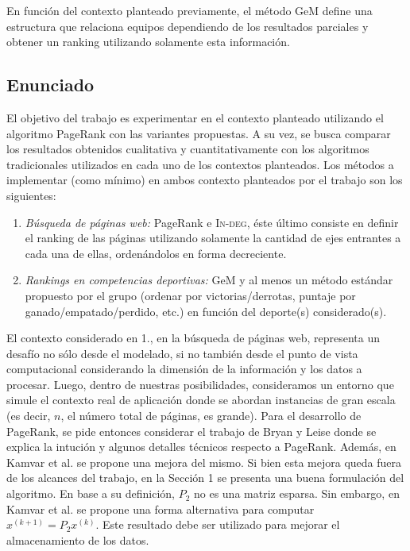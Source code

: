         En funci\'on del contexto planteado previamente, el m\'etodo GeM define una estructura que relaciona equipos dependiendo de los resultados parciales y obtener un ranking utilizando solamente esta informaci\'on.

    \subsection*{Enunciado}

        El objetivo del trabajo es experimentar en el contexto planteado utilizando el algoritmo PageRank con las variantes propuestas. A su vez, se busca comparar los resultados obtenidos cualitativa y cuantitativamente con los algoritmos tradicionales utilizados en cada uno de los contextos planteados. Los m\'etodos a implementar (como m\'inimo) en ambos contexto planteados por el trabajo son los siguientes:

        \begin{enumerate}
            \item \emph{B\'usqueda de p\'aginas web:} PageRank e \textsc{In-deg}, \'este \'ultimo consiste en definir el ranking de las p\'aginas utilizando solamente la cantidad de ejes entrantes a cada una de ellas, orden\'andolos en forma decreciente.
            \item \emph{Rankings en competencias deportivas:} GeM y al menos un m\'etodo est\'andar propuesto por el grupo (ordenar por victorias/derrotas, puntaje por ganado/empatado/perdido, etc.) en funci\'on del deporte(s) considerado(s).
        \end{enumerate}

        El contexto considerado en 1., en la b\'usqueda de p\'aginas web, representa un desaf\'io no s\'olo desde el modelado, si no tambi\'en desde el punto de vista computacional considerando la dimensi\'on de la informaci\'on y los datos a procesar. Luego, dentro de nuestras posibilidades, consideramos un entorno que simule el contexto real de aplicaci\'on donde se abordan instancias de gran escala (es decir, $n$, el n\'umero total de p\'aginas, es grande). Para el desarrollo de PageRank, se pide entonces considerar el trabajo de Bryan y Leise \cite{Bryan2006} donde se explica la intuci\'on y algunos detalles t\'ecnicos respecto a PageRank. Adem\'as, en Kamvar et al. \cite{Kamvar2003} se propone una mejora del mismo. Si bien esta mejora queda fuera de los alcances del trabajo, en la Secci\'on 1 se presenta una buena formulaci\'on del algoritmo. En base a su definici\'on, $P_2$ no es una matriz esparsa. Sin embargo, en Kamvar et al. \cite[Algoritmo 1]{Kamvar2003} se propone una forma alternativa para computar $x^{(k+1)} = P_2 x^{(k)}$. Este resultado debe ser utilizado para mejorar el almacenamiento de los datos.

